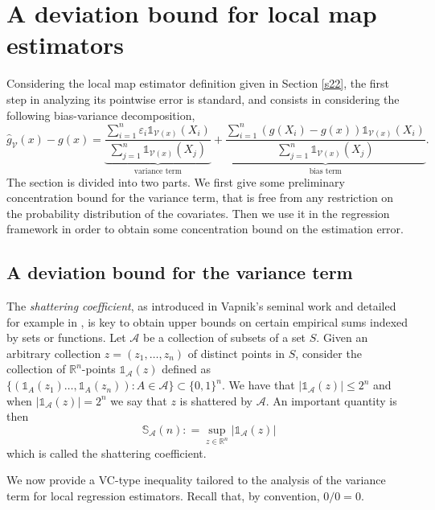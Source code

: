 \documentclass[paper=a4, fontsize=11pt]{scrartcl}
\newcommand{\ind}{\mathds{1}}
\begin{document}
\section{A deviation bound for local map estimators}\label{s30}
Considering the local map estimator definition given in Section \ref{s22}, the first step in analyzing its pointwise error is standard, and consists in considering the following bias-variance decomposition,
\begin{equation*}
    \hat g_{\mathcal V}(x) - g(x) = \underbrace{\frac{\sum_{i=1}^n \varepsilon_i \mathds 1 _{ \mathcal V(x) }(X_i)}{\sum_{j=1}^n \mathds 1 _{ \mathcal V(x) }(X_j)}}_{\text{variance term}}+\underbrace{\frac{\sum_{i=1}^n \left(g(X_i) - g(x)\right) \mathds 1 _{ \mathcal V(x) }(X_i)}{\sum_{j=1}^n \mathds 1 _{ \mathcal V(x) }(X_j)}}_{\text{bias term}}.
\end{equation*}
The section is divided into two parts. We first give some preliminary concentration bound for the variance term, that is free from any restriction on the probability distribution of the covariates. Then we use it in the regression framework in order to obtain some concentration bound
on the estimation error.

\subsection{A deviation bound for the variance term}\label{3.1}


The \textit{shattering coefficient}, as introduced in Vapnik's seminal work \cite{vapnik2015uniform} and  detailed for example in \cite{wellner1996},
is key to obtain upper bounds on certain empirical sums indexed by sets or functions. Let $\mathcal A$ be a collection of subsets of a set $ S$. Given an arbitrary collection $z =( z_1,\ldots, z_n)$ of distinct points in $  S$, consider the collection of $\mathbb R^n$-points
$ \ind _ {\mathcal A} (z)$ defined as $  \{ (\ind _ A (z_1) \ldots, \ind_A (z_n )) : A\in \mathcal A \}\subset \{0,1\}^n $. 
We have that $|\ind _ {\mathcal A} (z)  | \leq 2^n$ and when $   |\ind _ {\mathcal A} (z) |  = 2^n$ we say that $z$ is shattered by $\mathcal A$. An important quantity is then
 $$\mathbb S_\mathcal A(n) : =  \sup_{z\in \mathbb R^n} | \ind _ {\mathcal A} (z) | $$
which is called the shattering coefficient. %

We now provide a VC-type inequality tailored to the analysis of the variance term for local regression estimators. Recall that, by convention, $0/0=0$.
\end{document}
